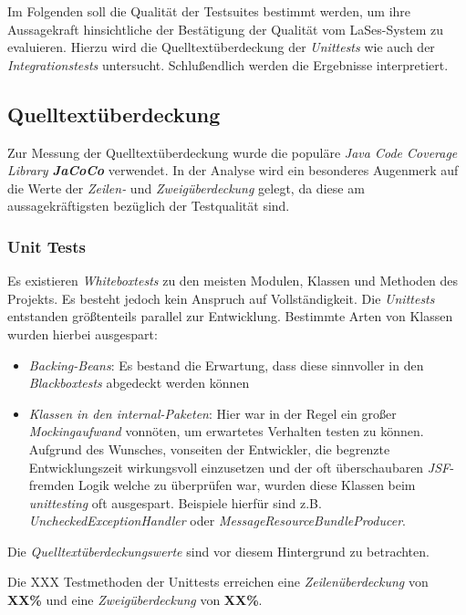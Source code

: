 
Im Folgenden soll die Qualität der Testsuites bestimmt werden,
um ihre Aussagekraft hinsichtliche der Bestätigung der Qualität vom LaSes-System zu evaluieren.
Hierzu wird die Quelltextüberdeckung der \emph{Unittests} wie auch der \emph{Integrationstests} untersucht.
Schlußendlich werden die Ergebnisse interpretiert.

\subsection{Quelltextüberdeckung}\label{subsec:quelltextueberdeckung}
Zur Messung der Quelltextüberdeckung wurde die populäre \emph{Java Code Coverage Library \textbf{JaCoCo}} verwendet.
In der Analyse wird ein besonderes Augenmerk auf die Werte der \emph{Zeilen-} und \emph{Zweigüberdeckung} gelegt,
da diese am aussagekräftigsten bezüglich der Testqualität sind.

\subsubsection{Unit Tests}
Es existieren \emph{Whiteboxtests} zu den meisten Modulen, Klassen und Methoden des Projekts.
Es besteht jedoch kein Anspruch auf Vollständigkeit.
Die \emph{Unittests} entstanden größtenteils parallel zur Entwicklung.
Bestimmte Arten von Klassen wurden hierbei ausgespart:

\begin{itemize}
    \item \emph{Backing-Beans}: Es bestand die Erwartung, dass diese sinnvoller in den \emph{Blackboxtests}
    abgedeckt werden können
    \item \emph{Klassen in den internal-Paketen}: Hier war in der Regel ein großer \emph{Mockingaufwand} vonnöten,
    um erwartetes Verhalten testen zu können.
    Aufgrund des Wunsches, vonseiten der Entwickler, die begrenzte Entwicklungszeit
    wirkungsvoll einzusetzen und der oft überschaubaren \emph{JSF}-fremden Logik welche zu überprüfen war,
    wurden diese Klassen beim \emph{unittesting} oft ausgespart.
    Beispiele hierfür sind z.B. \emph{UncheckedExceptionHandler} oder \emph{MessageResourceBundleProducer}.
\end{itemize}
Die \emph{Quelltextüberdeckungswerte} sind vor diesem Hintergrund zu betrachten.

\newline

Die XXX Testmethoden der Unittests erreichen eine \emph{Zeilenüberdeckung} von \textbf{XX\%}
und eine \emph{Zweigüberdeckung} von \textbf{XX\%}.

